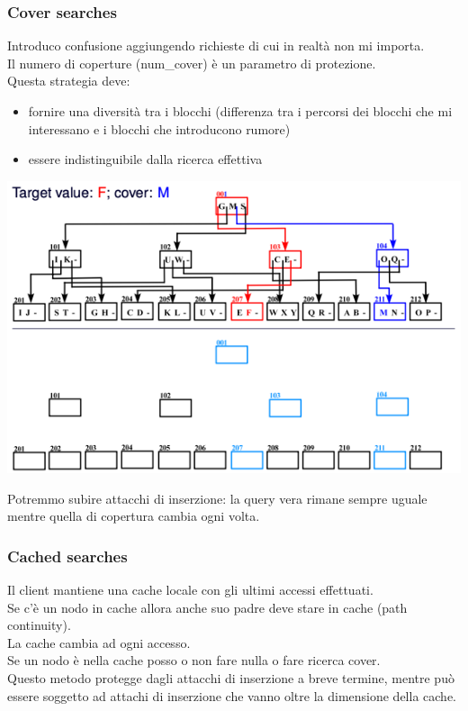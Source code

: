 \subsubsection{Cover searches}
Introduco confusione aggiungendo richieste di cui in realtà non mi importa.\\
Il numero di coperture (num\_cover) è un parametro di protezione.\\
Questa strategia deve:
\begin{itemize}
    \item fornire una diversità tra i blocchi (differenza tra i percorsi dei blocchi che mi interessano e i blocchi che introducono rumore)
    \item essere indistinguibile dalla ricerca effettiva
\end{itemize}
\begin{center}
    \includegraphics[scale=0.5]{img/coversearch.png}
\end{center}
Potremmo subire attacchi di inserzione: la query vera rimane sempre uguale mentre quella di copertura cambia ogni volta.

\subsubsection{Cached searches}
Il client mantiene una cache locale con gli ultimi accessi effettuati.\\
Se c’è un nodo in cache allora anche suo padre deve stare in cache (path continuity).\\
La cache cambia ad ogni accesso.\\
Se un nodo è nella cache posso o non fare nulla o fare ricerca cover.\\
Questo metodo protegge dagli attacchi di inserzione a breve termine, mentre può essere soggetto ad attachi di inserzione che vanno oltre la dimensione della cache.

